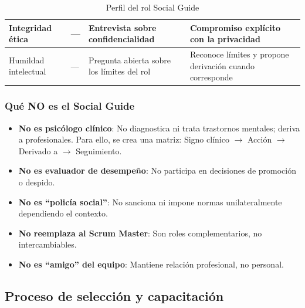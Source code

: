 \begin{table}[h]
\begin{tabularx}{\textwidth}{|p{2.6cm}|X|X|X|}
        \hline
        Integridad ética
                      & ---
                      & Entrevista sobre confidencialidad
                      & Compromiso explícito con la privacidad                                                                                                                          \\
        \hline
        Humildad intelectual
                      & ---
                      & Pregunta abierta sobre los límites del rol
                      & Reconoce límites y propone derivación cuando corresponde                                                                                                        \\
        \hline
    \end{tabularx}
    \caption{Perfil del rol Social Guide}
    \label{tab:perfil-social-guide}
\end{table}

\FloatBarrier

\subsubsection{Qué NO es el Social Guide}

\begin{itemize}
    \item \textbf{No es psicólogo clínico}: No diagnostica ni trata trastornos mentales; deriva a profesionales. Para ello, se crea una matriz: Signo clínico $\rightarrow$ Acción $\rightarrow$ Derivado a $\rightarrow$ Seguimiento.
    \item \textbf{No es evaluador de desempeño}: No participa en decisiones de promoción o despido.
    \item \textbf{No es ``policía social''}: No sanciona ni impone normas unilateralmente dependiendo el contexto.
    \item \textbf{No reemplaza al Scrum Master}: Son roles complementarios, no intercambiables.
    \item \textbf{No es ``amigo'' del equipo}: Mantiene relación profesional, no personal.
\end{itemize}

\subsection{Proceso de selección y capacitación}

